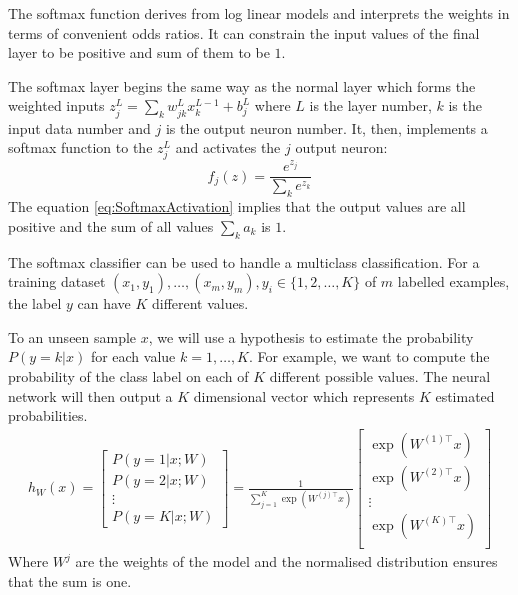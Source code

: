 The softmax function derives from log linear models and interprets the weights in terms of convenient odds ratios. It can constrain the input values of the final layer to be positive and sum of them to be $1$.

The softmax layer begins the same way as the normal layer which forms the weighted inputs $z^L_j = \sum_{k} w^L_{jk} x^{L-1}_k + b^L_j$ where $L$ is the layer number, $k$ is the input data number and $j$ is the output neuron number. It, then, implements a softmax function to the $z^L_j$ and activates the $j$ output neuron:
\begin{equation}\label{eq:SoftmaxActivation}
f_j(z) = \frac{e^{z_j}}{\sum_k e^{z_k}}
\end{equation}
The equation \ref{eq:SoftmaxActivation} implies that the output values are all positive and the sum of all values $\sum_k a_k$ is $1$.

The softmax classifier can be used to handle a multiclass classification. For a training dataset $(x_{1}, y_{1}), \ldots, (x_{m}, y_{m}), y_{i} \in \{1, 2, \ldots, K\} $ of $m$ labelled examples, the label $y$ can have $K$ different values.

To an unseen sample $x$, we will use a hypothesis to estimate the probability $P(y=k | x)$ for each value $k = 1, \ldots, K$. For example, we want to compute the probability of the class label on each of $K$ different possible values. The neural network will then output a $K$ dimensional vector which represents $K$ estimated probabilities. 
\begin{align}
h_{W}(x) =
\begin{bmatrix}
P(y = 1 | x; W) \\
P(y = 2 | x; W) \\
\vdots \\
P(y = K | x; W)
\end{bmatrix}
=
\frac{1}{ \sum_{j=1}^{K}{\exp(W^{(j)\top} x) }}
\begin{bmatrix}
\exp(W^{(1)\top} x ) \\
\exp(W^{(2)\top} x ) \\
\vdots \\
\exp(W^{(K)\top} x ) \\
\end{bmatrix}
\end{align}
Where $W^{j}$ are the weights of the model and the normalised distribution ensures that the sum is one.

